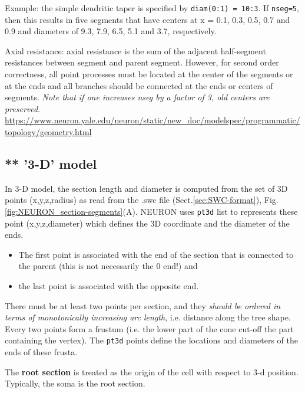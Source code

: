 Example: the simple dendritic taper is specified by \verb!diam(0:1) = 10:3!.
If \verb!nseg=5!, then 
this results in five segments that have centers at x = 0.1, 0.3, 0.5, 0.7 and
0.9 and diameters of 9.3, 7.9, 6.5, 5.1 and 3.7, respectively.

Axial resistance: axial resistance is the sum of the adjacent half-segment
resistances between segment and parent segment.
However, for second order correctness, all point processes must be located at
the center of the segments or at the ends and all branches should be connected
at the ends or centers of segments.
{\it Note that if one increases nseg by a factor of 3, old centers are
preserved}.
\url{https://www.neuron.yale.edu/neuron/static/new_doc/modelspec/programmatic/topology/geometry.html}

\subsection{** '3-D' model}
\label{sec:pt3d-method-NEURON}

In 3-D model, the section length and diameter is computed from the set of 3D
points (x,y,z,radius) as read from the .swc file (Sect.\ref{sec:SWC-format}),
Fig.\ref{fig:NEURON_section-segments}(A). NEURON uses \verb!pt3d! list to 
represents these point (x,y,z,diameter) which defines the 3D coordinate and the
diameter of the ends.

\begin{itemize}
  \item  The first point is associated with the end of the section that is connected to
the parent (this is not necessarily the 0 end!) and 

  \item the last point is associated with the opposite end.
\end{itemize}
There must be at least two points per section, and they {\it should be ordered
in terms of monotonically increasing arc length}, i.e. distance along the tree
shape. Every two points form a frustum (i.e. the lower part of the cone cut-off
the part containing the vertex). The \verb!pt3d! points define the locations and
diameters of the ends of these frusta.


The {\bf root section} is treated as the origin of the cell with respect to 3-d
position. Typically, the soma is the root section.

